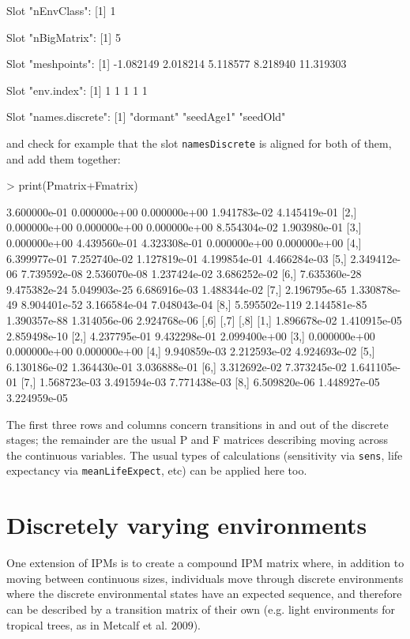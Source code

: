 \documentclass{article}
\begin{document}
\begin{Schunk}
\begin{Soutput}
Slot "nEnvClass":
[1] 1

Slot "nBigMatrix":
[1] 5

Slot "meshpoints":
[1] -1.082149  2.018214  5.118577  8.218940 11.319303

Slot "env.index":
[1] 1 1 1 1 1

Slot "names.discrete":
[1] "dormant"  "seedAge1" "seedOld" 
\end{Soutput}
\end{Schunk}
and check for example that the slot {\tt namesDiscrete} is aligned for both of them, and add
them together:
\begin{Schunk}
\begin{Sinput}
> print(Pmatrix+Fmatrix)
\end{Sinput}
\begin{Soutput}
              [,1]         [,2]         [,3]         [,4]         [,5]
[1,]  3.600000e-01 0.000000e+00 0.000000e+00 1.941783e-02 4.145419e-01
[2,]  0.000000e+00 0.000000e+00 0.000000e+00 8.554304e-02 1.903980e-01
[3,]  0.000000e+00 4.439560e-01 4.323308e-01 0.000000e+00 0.000000e+00
[4,]  6.399977e-01 7.252740e-02 1.127819e-01 4.199854e-01 4.466284e-03
[5,]  2.349412e-06 7.739592e-08 2.536070e-08 1.237424e-02 3.686252e-02
[6,]  7.635360e-28 9.475382e-24 5.049903e-25 6.686916e-03 1.488344e-02
[7,]  2.196795e-65 1.330878e-49 8.904401e-52 3.166584e-04 7.048043e-04
[8,] 5.595502e-119 2.144581e-85 1.390357e-88 1.314056e-06 2.924768e-06
             [,6]         [,7]         [,8]
[1,] 1.896678e-02 1.410915e-05 2.859498e-10
[2,] 4.237795e-01 9.432298e-01 2.099400e+00
[3,] 0.000000e+00 0.000000e+00 0.000000e+00
[4,] 9.940859e-03 2.212593e-02 4.924693e-02
[5,] 6.130186e-02 1.364430e-01 3.036888e-01
[6,] 3.312692e-02 7.373245e-02 1.641105e-01
[7,] 1.568723e-03 3.491594e-03 7.771438e-03
[8,] 6.509820e-06 1.448927e-05 3.224959e-05
\end{Soutput}
\end{Schunk}
The first three rows and columns concern transitions in and out of the discrete stages; the remainder are the usual P and F matrices describing moving across the continuous variables. The usual types of calculations (sensitivity via {\tt sens}, life expectancy via {\tt meanLifeExpect}, etc) can be applied here too.    

\section{Discretely varying environments}
One extension of IPMs is to create a compound IPM matrix where, in addition to
moving between continuous sizes, individuals move through discrete environments where the discrete environmental states have an expected sequence, and therefore can be described by a transition matrix of their own (e.g. light environments for tropical trees, as in Metcalf et al. $2009$).
\end{document}

